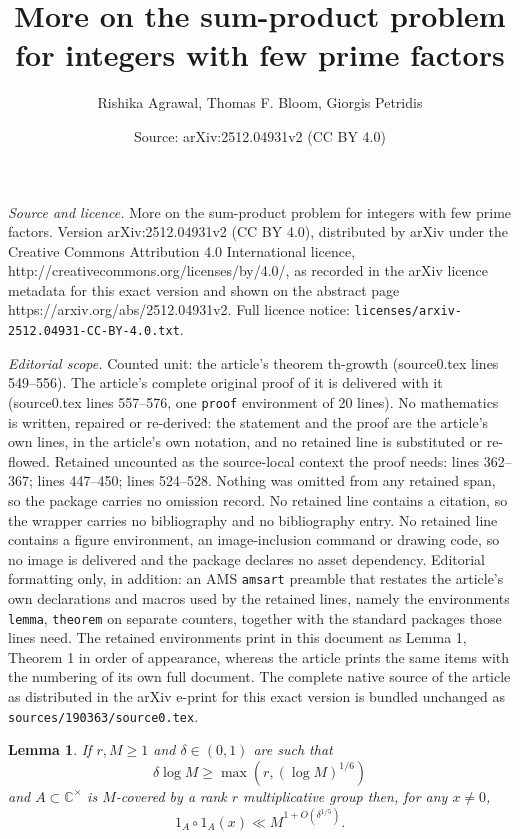 \documentclass[10pt,a4paper]{amsart}
\title{More on the sum-product problem for integers with few prime factors}
\author{Rishika Agrawal, Thomas F. Bloom, Giorgis Petridis}
\date{Source: arXiv:2512.04931v2 (CC BY 4.0)}
\newtheorem{lemma}{Lemma}
\newcommand{\bbc}{\mathbb{C}}
\renewcommand{\geq}{\geqslant}
\begin{document}
\maketitle

\noindent\emph{Source and licence.} More on the sum-product problem for integers with few prime factors. Version arXiv:2512.04931v2 (CC BY 4.0), distributed by arXiv under the Creative Commons Attribution 4.0 International licence, http://creativecommons.org/licenses/by/4.0/, as recorded in the arXiv licence metadata for this exact version and shown on the abstract page https://arxiv.org/abs/2512.04931v2. Full licence notice: \texttt{licenses/arxiv-2512.04931-CC-BY-4.0.txt}.\par\smallskip

\noindent\textit{Editorial scope.} Counted unit: the article's theorem th-growth (source0.tex lines 549--556). The article's complete original proof of it is delivered with it (source0.tex lines 557--576, one \texttt{proof} environment of 20 lines). No mathematics is written, repaired or re-derived: the statement and the proof are the article's own lines, in the article's own notation, and no retained line is substituted or re-flowed.  Retained uncounted as the source-local context the proof needs: lines 362--367; lines 447--450; lines 524--528.  Nothing was omitted from any retained span, so the package carries no omission record.  No retained line contains a citation, so the wrapper carries no bibliography and no bibliography entry.  No retained line contains a figure environment, an image-inclusion command or drawing code, so no image is delivered and the package declares no asset dependency.  Editorial formatting only, in addition: an AMS \texttt{amsart} preamble that restates the article's own declarations and macros used by the retained lines, namely the environments \texttt{lemma}, \texttt{theorem} on separate counters, together with the standard packages those lines need.  The retained environments print in this document as Lemma 1, Theorem 1 in order of appearance, whereas the article prints the same items with the numbering of its own full document.  The complete native source of the article as distributed in the arXiv e-print for this exact version is bundled unchanged as \texttt{sources/190363/source0.tex}.
\begin{lemma}\label{lem-point}
If $r,M\geq 1$ and $\delta\in (0,1)$ are such that 
\[\delta \log M \geq \max(r, (\log M)^{1/6})\]
and $A\subset \bbc^\times$ is $M$-covered by a rank $r$ multiplicative group then, for any $x\neq 0$, 
\[1_A\circ 1_A(x)\ll M^{1+O(\delta^{1/5})}.\]
\end{lemma}
\end{document}
